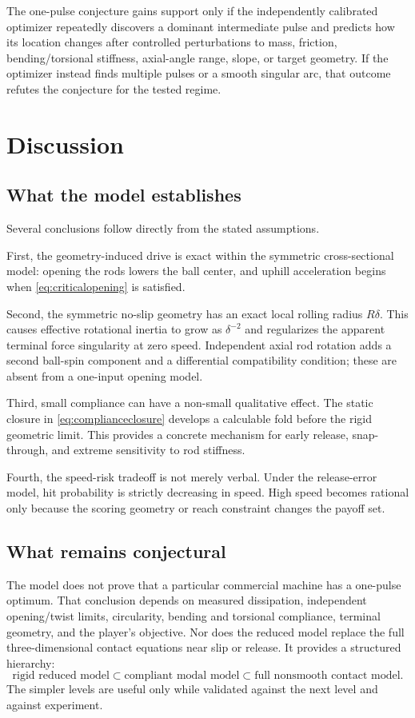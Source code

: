 \documentclass[11pt]{article}
\numberwithin{equation}{section}
\theoremstyle{definition}
\theoremstyle{remark}
\begin{document}
The one-pulse conjecture gains support only if the independently calibrated optimizer repeatedly discovers a dominant intermediate pulse and predicts how its location changes after controlled perturbations to mass, friction, bending/torsional stiffness, axial-angle range, slope, or target geometry.  If the optimizer instead finds multiple pulses or a smooth singular arc, that outcome refutes the conjecture for the tested regime.

\section{Discussion}

\subsection{What the model establishes}

Several conclusions follow directly from the stated assumptions.

First, the geometry-induced drive is exact within the symmetric cross-sectional model: opening the rods lowers the ball center, and uphill acceleration begins when \cref{eq:criticalopening} is satisfied.

Second, the symmetric no-slip geometry has an exact local rolling radius $R\delta$.  This causes effective rotational inertia to grow as $\delta^{-2}$ and regularizes the apparent terminal force singularity at zero speed.  Independent axial rod rotation adds a second ball-spin component and a differential compatibility condition; these are absent from a one-input opening model.

Third, small compliance can have a non-small qualitative effect.  The static closure in \cref{eq:complianceclosure} develops a calculable fold before the rigid geometric limit.  This provides a concrete mechanism for early release, snap-through, and extreme sensitivity to rod stiffness.

Fourth, the speed-risk tradeoff is not merely verbal.  Under the release-error model, hit probability is strictly decreasing in speed.  High speed becomes rational only because the scoring geometry or reach constraint changes the payoff set.

\subsection{What remains conjectural}

The model does not prove that a particular commercial machine has a one-pulse optimum.  That conclusion depends on measured dissipation, independent opening/twist limits, circularity, bending and torsional compliance, terminal geometry, and the player's objective.  Nor does the reduced model replace the full three-dimensional contact equations near slip or release.  It provides a structured hierarchy:
\begin{equation}
  \text{rigid reduced model}
  \subset
  \text{compliant modal model}
  \subset
  \text{full nonsmooth contact model}.
\end{equation}
The simpler levels are useful only while validated against the next level and against experiment.
\end{document}
